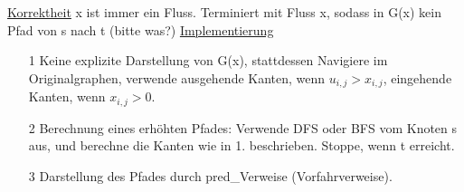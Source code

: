 \documentclass[a4paper]{article}
\begin{document}
\underline{Korrektheit} x ist immer ein Fluss. Terminiert mit Fluss x, sodass in G(x) kein Pfad von s nach t (bitte was?)
\underline{Implementierung} 
\begin{itemize}
\item[1] Keine explizite Darstellung von G(x), stattdessen Navigiere im Originalgraphen, verwende ausgehende Kanten, wenn $u_{i,j} > x_{i,j}$, eingehende Kanten, wenn $x_{i,j} > 0$.
\item[2] Berechnung eines erhöhten Pfades: Verwende DFS oder BFS vom Knoten s aus, und berechne die Kanten wie in 1. beschrieben. Stoppe, wenn t erreicht.
\item[3] Darstellung des Pfades durch pred\_Verweise (Vorfahrverweise).
\end{itemize} 
\end{document}

